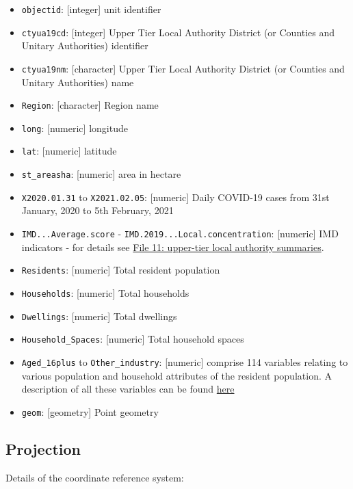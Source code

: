 \documentclass[
]{book}
\providecommand{\tightlist}{%
  \setlength{\itemsep}{0pt}\setlength{\parskip}{0pt}}
\begin{document}
\begin{itemize}
\tightlist
\item
  \texttt{objectid}: {[}integer{]} unit identifier
\item
  \texttt{ctyua19cd}: {[}integer{]} Upper Tier Local Authority District (or Counties and Unitary Authorities) identifier
\item
  \texttt{ctyua19nm}: {[}character{]} Upper Tier Local Authority District (or Counties and Unitary Authorities) name
\item
  \texttt{Region}: {[}character{]} Region name
\item
  \texttt{long}: {[}numeric{]} longitude
\item
  \texttt{lat}: {[}numeric{]} latitude
\item
  \texttt{st\_areasha}: {[}numeric{]} area in hectare
\item
  \texttt{X2020.01.31} to \texttt{X2021.02.05}: {[}numeric{]} Daily COVID-19 cases from 31st January, 2020 to 5th February, 2021
\item
  \texttt{IMD...Average.score} - \texttt{IMD.2019...Local.concentration}: {[}numeric{]} IMD indicators - for details see \href{https://www.gov.uk/government/statistics/english-indices-of-deprivation-2019}{File 11: upper-tier local authority summaries}.
\item
  \texttt{Residents}: {[}numeric{]} Total resident population
\item
  \texttt{Households}: {[}numeric{]} Total households
\item
  \texttt{Dwellings}: {[}numeric{]} Total dwellings
\item
  \texttt{Household\_Spaces}: {[}numeric{]} Total household spaces
\item
  \texttt{Aged\_16plus} to \texttt{Other\_industry}: {[}numeric{]} comprise 114 variables relating to various population and household attributes of the resident population. A description of all these variables can be found \href{data/assignment_2_covid/census_vars.csv}{here}
\item
  \texttt{geom}: {[}geometry{]} Point geometry
\end{itemize}

\hypertarget{projection-1}{%
\subsection*{Projection}\label{projection-1}}

Details of the coordinate reference system:
\end{document}
